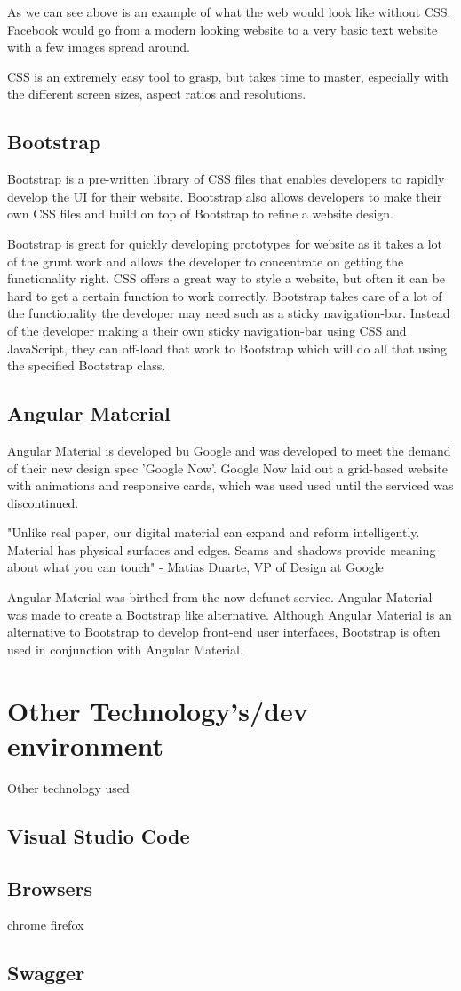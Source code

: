 As we can see above is an example of what the web would look like without CSS. Facebook would go from a modern looking website to a very basic text website with a few images spread around.

CSS is an extremely easy tool to grasp, but takes time to master, especially with the different screen sizes, aspect ratios and resolutions.

\subsection{Bootstrap}
Bootstrap is a pre-written library of CSS files that enables developers to rapidly develop the UI for their website. Bootstrap also allows developers to make their own CSS files and build on top of Bootstrap to refine a website design.

Bootstrap is great for quickly developing prototypes for website as it takes a lot of the grunt work and allows the developer to concentrate on getting the functionality right. CSS offers a great way to style a website, but often it can be hard to get a certain function to work correctly. Bootstrap takes care of a lot of the functionality the developer may need such as a sticky navigation-bar. Instead of the developer making a their own sticky navigation-bar using CSS and JavaScript, they can off-load that work to Bootstrap which will do all that using the specified Bootstrap class.

\subsection{Angular Material}
Angular Material is developed bu Google and was developed to meet the demand of their new design spec 'Google Now'. Google Now laid out a grid-based website with animations and responsive cards, which was used used until the serviced was discontinued.

\begin{displayquote}
"Unlike real paper, our digital material can expand and reform intelligently. Material has physical surfaces and edges. Seams and shadows provide meaning about what you can touch" - Matias Duarte, VP of Design at Google
\end{displayquote}

Angular Material was birthed from the now defunct service. Angular Material was made to create a Bootstrap like alternative. Although Angular Material is an alternative to Bootstrap to develop front-end user interfaces, Bootstrap is often used in conjunction with Angular Material.

\section{Other Technology's/dev environment}
Other technology used
\subsection{Visual Studio Code}
\subsection{Browsers}
chrome firefox
\subsection{Swagger}